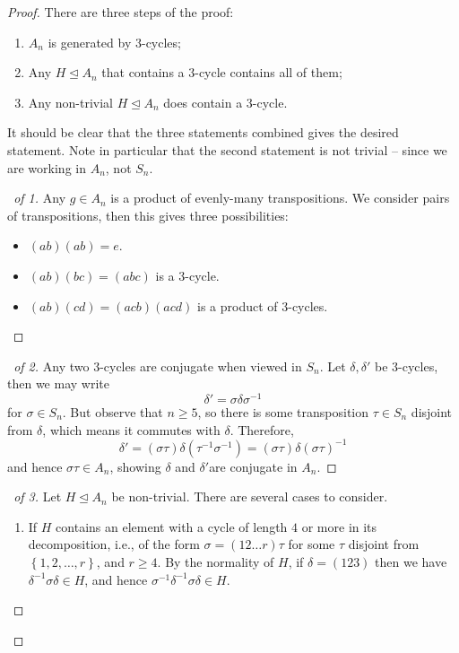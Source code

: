 \documentclass{article}
\theoremstyle{definition}
\theoremstyle{remark}
\newcommand{\pqty}[1]{\left(#1\right)}
\newcommand{\Bqty}[1]{\left\{#1\right\}}
\newcommand{\perm}[1]{(#1)}
\newcommand{\inverse}{^{-1}}
\newcommand{\normalsub}{\trianglelefteq}
\begin{document}
\begin{proof}
    There are three steps of the proof:
    \begin{enumerate}
        \item \(A_n\) is generated by \(3\)-cycles;
        \item Any \(H \normalsub A_n\) that contains a \(3\)-cycle contains all of them;
        \item Any non-trivial \(H \normalsub A_n\) does contain a \(3\)-cycle.
    \end{enumerate}

    It should be clear that the three statements combined gives the desired statement. Note in particular that the second statement is not trivial -- since we are working in \(A_n\), not \(S_n\).

    \begin{proof}[\proofname\ of 1]
        Any \(g \in A_n\) is a product of evenly-many transpositions. We consider pairs of transpositions, then this gives three possibilities:
        \begin{itemize}
            \item \(\perm{ab} \perm{ab} = e\).
            \item \(\perm{ab} \perm{bc} = \perm{abc}\) is a \(3\)-cycle.
            \item \(\perm{ab} \perm{cd} = \perm{acb} \perm{acd}\) is a product of \(3\)-cycles.
        \end{itemize}
    \end{proof}

    \begin{proof}[\proofname\ of 2]
        Any two \(3\)-cycles are conjugate when viewed in \(S_n\). Let \(\delta, \delta'\) be \(3\)-cycles, then we may write
        \[
            \delta' = \sigma \delta \sigma\inverse
        \]
        for \(\sigma \in S_n\). But observe that \(n \geq 5\), so there is some transposition \(\tau \in S_n\) disjoint from \(\delta\), which means it commutes with \(\delta\). Therefore,
        \[
            \delta' = \pqty{\sigma \tau} \delta \pqty{\tau\inverse \sigma\inverse} = \pqty{\sigma \tau} \delta \pqty{\sigma \tau}\inverse
        \]
        and hence \(\sigma \tau \in A_n\), showing \(\delta\) and \(\delta'\)are conjugate in \(A_n\).
    \end{proof}

    \begin{proof}[\proofname\ of 3]
        Let \(H \normalsub A_n\) be non-trivial. There are several cases to consider.
        \begin{enumerate}
            \item If \(H\) contains an element with a cycle of length \(4\) or more in its decomposition, i.e., of the form \(\sigma = \perm{1 2 {\ldots} r} \tau\) for some \(\tau\) disjoint from \(\Bqty{1, 2, \ldots, r}\), and \(r \geq 4\). By the normality of \(H\), if \(\delta = \perm{1 2 3}\) then we have \(\delta\inverse \sigma \delta \in H\), and hence \(\sigma\inverse \delta\inverse \sigma \delta \in H\).
            

\end{enumerate}
\end{proof}
\end{proof}
\end{document}
